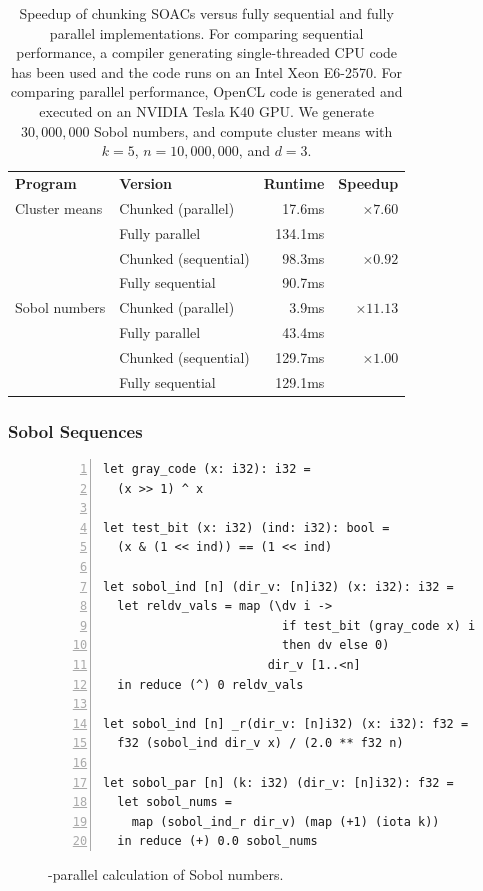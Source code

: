 \begin{table}
  \centering
  \begin{tabular}{llrr}
    \textbf{Program} & \textbf{Version}  & \textbf{Runtime} & \textbf{Speedup} \\
\multirow{4}{*}{Cluster means} & Chunked (parallel) & 17.6ms & \multirow{2}{*}{$\times7.60$} \\
& Fully parallel & 134.1ms & \\\cline{2-4}
& Chunked (sequential) & 98.3ms & \multirow{2}{*}{$\times0.92$} \\
& Fully sequential & 90.7ms & \\\hline

\multirow{4}{*}{Sobol numbers} & Chunked (parallel) & 3.9ms & \multirow{2}{*}{$\times11.13$} \\
& Fully parallel & 43.4ms & \\\cline{2-4}
& Chunked (sequential) & 129.7ms & \multirow{2}{*}{$\times1.00$} \\
& Fully sequential & 129.1ms & \\
  \end{tabular}
  \caption{Speedup of chunking SOACs versus fully sequential and
    fully parallel implementations.  For comparing sequential
    performance, a compiler generating single-threaded CPU code has
    been used and the code runs on an Intel Xeon E6-2570.  For
    comparing parallel performance, OpenCL code is generated and
    executed on an NVIDIA Tesla K40 GPU.  We generate $30,000,000$
    Sobol numbers, and compute cluster means with
    $k=5$, $n=10,000,000$, and $d=3$.}
  \label{tab:streaming-perf}
\end{table}

\subsubsection{Sobol Sequences}
\label{sec:sobolsequences}

\begin{figure}
\begin{lstlisting}[numbers=left,xleftmargin=0pt]
let gray_code (x: i32): i32 =
  (x >> 1) ^ x

let test_bit (x: i32) (ind: i32): bool =
  (x & (1 << ind)) == (1 << ind)

let sobol_ind [n] (dir_v: [n]i32) (x: i32): i32 =
  let reldv_vals = map (\dv i ->
                         if test_bit (gray_code x) i
                         then dv else 0)
                       dir_v [1..<n]
  in reduce (^) 0 reldv_vals

let sobol_ind [n] _r(dir_v: [n]i32) (x: i32): f32 =
  f32 (sobol_ind dir_v x) / (2.0 ** f32 n)

let sobol_par [n] (k: i32) (dir_v: [n]i32): f32 =
  let sobol_nums =
    map (sobol_ind_r dir_v) (map (+1) (iota k))
  in reduce (+) 0.0 sobol_nums
\end{lstlisting}
\caption{-parallel calculation of Sobol numbers.}
\label{fig:parallel-sobol}
\end{figure}

